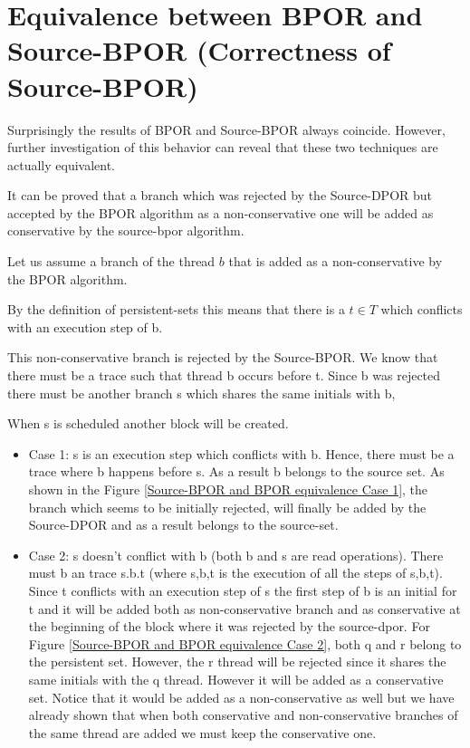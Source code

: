 
\section{Equivalence between BPOR and Source-BPOR (Correctness of Source-BPOR)}
Surprisingly the results of BPOR and Source-BPOR always coincide. However, further investigation of this behavior can reveal that these two techniques
are actually equivalent. 

It can be proved that a branch which was rejected by the Source-DPOR but accepted by the BPOR algorithm as a non-conservative one will be added as 
conservative by the source-bpor algorithm.

Let us assume a branch of the thread $b$ that is added as a non-conservative by the BPOR algorithm.

By the definition of persistent-sets this means that there is a $t \in T$ which
conflicts with an execution step of b. 

This non-conservative branch is rejected by the Source-BPOR. We know that there must be
 a trace such that thread b occurs before t. Since b was rejected there must be another branch s which shares the same initials
  with b, 
  
When s is scheduled another block will be created.
 
\begin{itemize}
\item Case 1: s is an execution step which conflicts with b. Hence, there must be a trace where b happens before s. As a result b belongs to the source set.
As shown in the Figure \ref{Source-BPOR and BPOR equivalence Case 1}, the branch which seems to be initially rejected, will finally be added by the Source-DPOR and as a result belongs to the source-set.
   
\item Case 2: 
   s doesn’t conflict with b (both b and s are read operations). There must b an trace s.b.t (where s,b,t is the execution
   of all the steps of s,b,t). 
   Since t conflicts with an execution step of s the ﬁrst step of b is an initial for t and it will be added both as non-conservative branch and 
   as conservative at the beginning of the block where it was rejected by the source-dpor. For Figure \ref{Source-BPOR and BPOR equivalence Case 2}, both q and r belong to the persistent set. However,
   the r thread will be rejected since it shares the same initials with the q thread. However it will be added as a conservative set. Notice that it would be added as a
   non-conservative as well but we have already shown that when both conservative and non-conservative branches of the same thread are added we must keep the conservative one.

\end{itemize}
   
